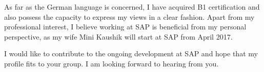 \documentclass[12pt,a4paper,sans]{moderncv}        %
\begin{document}
As far as the German language is concerned, I have acquired B1 certification and also possess the capacity to express my views in a clear fashion. Apart from my professional interest, I believe working at SAP is beneficial from my personal perspective, as my wife Mini Kaushik will start at SAP from April 2017. 

I would like to contribute to the ongoing development at SAP and hope that my profile fits to your group. I am looking forward to hearing from you. 


\makeletterclosing
\end{document}
